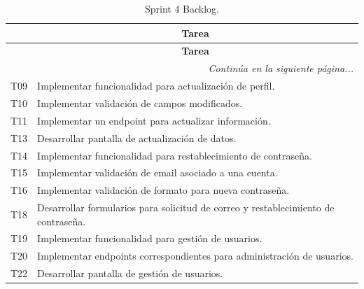 \begin{longtable}[c]{|c|m{}|}
    \caption{Sprint 4 Backlog.}
    \label{tab:sprintBacklog4} \\
    
    \hline
    \rowcolor{gray!50}
    \multicolumn{1}{|c|}{\textbf{Código}} & \multicolumn{1}{c|}{\textbf{Tarea}} \\
    \hline
    \endfirsthead

    \hline
    \rowcolor{gray!50}
    \multicolumn{1}{|c|}{\textbf{Código}} & \multicolumn{1}{c|}{\textbf{Tarea}} \\
    \hline
    \endhead

    \multicolumn{2}{r}{\textit{Continúa en la siguiente página...}} \\
    \endfoot
    
    \endlastfoot

    T09 & Implementar funcionalidad para actualización de perfil. \\
    \hline
    T10 & Implementar validación de campos modificados. \\
    \hline
    T11 & Implementar un endpoint para actualizar información. \\
    \hline
    T13 & Desarrollar pantalla de actualización de datos. \\
    \hline
    T14 & Implementar funcionalidad para restablecimiento de contraseña. \\
    \hline
    T15 & Implementar validación de email asociado a una cuenta. \\
    \hline
    T16 & Implementar validación de formato para nueva contraseña. \\
    \hline
    T18 & Desarrollar formularios para solicitud de correo y restablecimiento de contraseña. \\
    \hline
    T19 & Implementar funcionalidad para gestión de usuarios. \\
    \hline
    T20 & Implementar endpoints correspondientes para administración de usuarios. \\
    \hline
    T22 & Desarrollar pantalla de gestión de usuarios. \\
    \hline
\end{longtable}